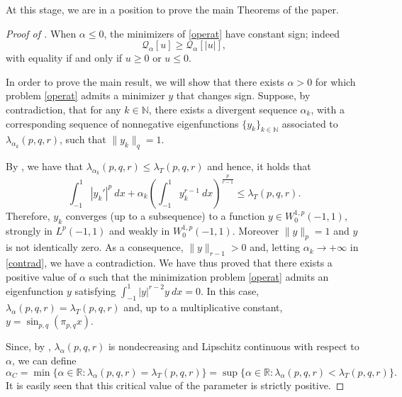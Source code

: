 \documentclass{amsart}
\theoremstyle{definition}
\theoremstyle{remark}
\newcommand{\R}{\mathbb{R}}
\newcommand{\N}{\mathbb{N}}
\begin{document}
At this stage, we are in a position to prove the main Theorems of the paper.
\begin{proof}[Proof of ]
When $\alpha\le 0$, the minimizers of \eqref{operat} have constant sign; indeed
\[
\mathcal{Q}_\alpha[u] \ge \mathcal Q_{\alpha}[|u|],
\]
with equality if and only if $u\ge 0$ or $u\le 0$. 

In order to prove the main result, we will show that there exists $\alpha>0$ for which problem \eqref{operat} admits a minimizer $y$ that changes sign. Suppose, by contradiction, that for any $k\in\N$, there exists a divergent sequence $\alpha_{k}$, with a corresponding sequence of nonnegative eigenfunctions $\{y_{k}\}_{k\in\N}$ associated to $\lambda_{\alpha_{k}}(p,q,r)$, such that %
 $\|y_k\|_q=1$. 

By , we have that $\lambda_{\alpha_{k}}(p,q,r)\le\lambda_T(p,q,r)$ and hence, it holds that
\begin{equation}
\label{contrad}
\displaystyle \int_{-1}^{1} | y_k'|^p\  dx+\alpha_k \left(\int_{-1}^{1} y_k^{r-1}\  dx\right)^{\frac{p}{r-1}}\le\lambda_T(p,q,r).
\end{equation}
Therefore, $y_k$ converges (up to a subsequence) to a function $y\in W_0^{1,p}(-1,1)$, strongly in $L^p(-1,1)$ and weakly in $W_0^{1,p}(-1,1)$. Moreover $\|y\|_{p}=1$ and $y$ is not identically zero. As a consequence, $\|y\|_{r-1}>0$ and, letting $\alpha_k\rightarrow +\infty$ in \eqref{contrad}, we have a contradiction. We have thus proved that there exists a positive value of $\alpha$ such that the minimization problem \eqref{operat}
admits an eigenfunction $y$ satisfying $\int_{-1}^1|y|^{r-2}y\  dx=0$. In this case, $\lambda_\alpha(p,q,r)=\lambda_T(p,q,r)$ and, up to a multiplicative constant, $y=\sin_{p,q} (\pi_{p,q} x)$.

Since, by , $\lambda_\alpha(p,q,r)$ is nondecreasing and Lipschitz continuous with respect to $\alpha$, we can define 
\[
\alpha_{C}=\min\{\alpha\in\R\colon \lambda_\alpha(p,q,r)=\lambda_T(p,q,r)\}=\sup\{\alpha\in\R\colon \lambda_\alpha(p,q,r)<\lambda_T(p,q,r) \}.
\]
It is easily seen that this critical value of the parameter is strictly positive.
\end{proof}
\end{document}
